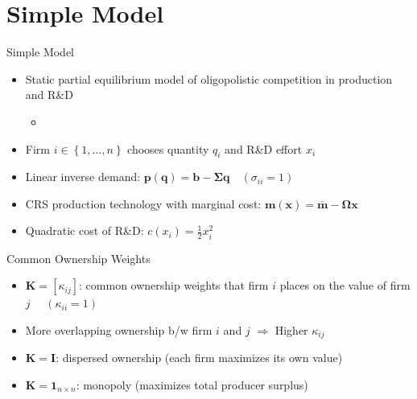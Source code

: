 \documentclass[
  10pt,               %
  aspectratio=169,    %
]{beamer}
\theoremstyle{plain}
\begin{document}
\section{Simple Model}

\begin{frame}{Simple Model}
  \begin{itemize}
    \item Static partial equilibrium model of oligopolistic competition in production and R\&D \\
    \begin{itemize}
      \item {\footnotesize \citet{d-Aspremont1988-je,Kamien1992-la,Leahy1997-xr,Lopez2019-sl,Anton2024-pw}} %
    \end{itemize}
          \medskip{}
    \item Firm $i\in \left\{1,\ldots, n\right\}$ chooses quantity $q_i$ and R\&D effort $x_i$
          \medskip{}
    \item Linear inverse demand: $\bm{p}(\bm{q}) = \bm{b} - \bm{\Sigma} \bm{q} \quad (\sigma_{ii} = 1)$
          \medskip{}
    \item CRS production technology with marginal cost: $\bm{m}(\bm{x}) = \overline{\bm{m}} - \bm{\Omega} \bm{x}$\medskip{}
    \item Quadratic cost of R\&D: $c(x_i) = \frac{1}{2}x_i^2$
  \end{itemize}
\end{frame}

\begin{frame}{Common Ownership Weights}
  \label{ownership_weight}
  \begin{itemize}
    \item $\bm{K}=\left[\kappa_{ij}\right]$: common ownership weights that firm $i$ places on the value of firm $j$ $\quad (\kappa_{ii} = 1)$
    \medskip{}
    \item More overlapping ownership b/w firm $i$ and $j$ $\Longrightarrow$ Higher $\kappa_{ij}$ \hfill\hyperlink{rotemberg}{}
    \medskip{}
    \item $\bm{K}=\bm{I}$: dispersed ownership (each firm maximizes its own value)
    \medskip{}
    \item  $\bm{K}=\bm{1}_{n \times n}$: monopoly (maximizes total producer surplus)
  \end{itemize}
\end{frame}
\end{document}

